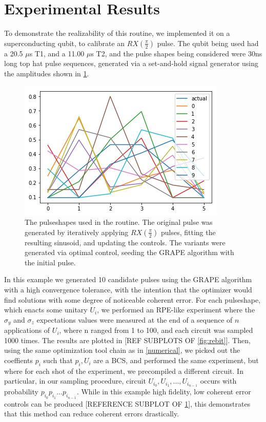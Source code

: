 \documentclass[aps,nofootinbib,pra,notitlepage,twocolumn]{revtex4-1}
\begin{document}
\section{Experimental Results}\label{experimental}
To demonstrate the realizability of this routine, we implemented it on a superconducting qubit, to calibrate an $RX(\frac{\pi}{2})$ pulse. The qubit being used had a 20.5 $\mu$s T1, and a 11.00 $\mu$s T2, and the pulse shapes being considered were 30ns long top hat pulse sequences, generated via a set-and-hold signal generator using the amplitudes shown in \ref{fig:pulseshapes}. 
\begin{figure}[H]
  \centering
  \includegraphics[width=.75\columnwidth]{pulseshapes.png}
  \caption{The pulseshapes used in the routine. The original pulse was generated by iteratively applying $RX(\frac{\pi}{2})$ pulses, fitting the resulting sinusoid, and updating the controls. The variants were generated via optimal control, seeding the GRAPE algorithm with the initial pulse.}
  \label{fig:pulseshapes}
\end{figure}

In this example we generated 10 candidate pulses using the GRAPE algorithm with a high convergence tolerance, with the intention that the optimizer would find solutions with some degree of noticeable coherent error. For each pulseshape, which enacts some unitary $U_i$, we performed an RPE-like experiment\cite{Kimmel2015} where the $\sigma_y$ and $\sigma_z$ expectations values were measured at the end of a sequence of $n$ applications of $U_i$, where n ranged from 1 to 100, and each circuit was sampled 1000 times. The results are plotted in [REF SUBPLOTS OF \ref{fig:rebit}]. Then, using the same optimization tool chain as in \ref{numerical}, we picked out the coeffients $p_i$ such that $p_i, U_i$ are a BCS, and performed the same experiment, but where for each shot of the experiment, we precompiled a different circuit. In particular, in our sampling procedure, circuit $U_{i_0}, U_{i_1}, ..., U_{i_{n-1}}$ occurs with probability $p_{i_0}p_{i_1}...p_{i_{n-1}}$. While in this example high fidelity, low coherent error controls can be produced [REFERENCE SUBPLOT OF \ref{fig:pulseshapes}], this demonstrates that this method can reduce coherent errors drastically.
\end{document}
